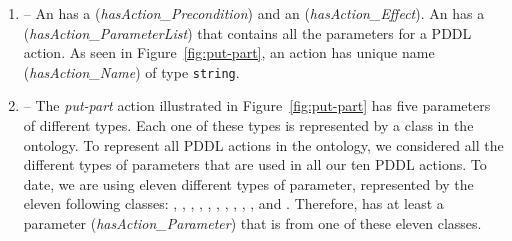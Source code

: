 \begin{enumerate}
\item {} -- An  has a  (\emph{hasAction\_Precondition}) and an  (\emph{hasAction\_Effect}). An  has a  (\emph{hasAction\_ParameterList}) that contains all the parameters for a PDDL action. As seen in Figure~\ref{fig:put-part}, an action has unique name (\emph{hasAction\_Name}) of type \texttt{string}.
\item {} -- The \textsl{put-part} action illustrated in Figure~\ref{fig:put-part} has five parameters of different types. Each one of these types is represented by a class in the  ontology. To represent all PDDL actions in the  ontology, we considered all the different types of parameters that are used in all our ten PDDL actions. To date, we are using eleven different types of parameter, represented by the eleven following classes: , , , , , , , , , , and . Therefore,  has at least a parameter (\emph{hasAction\_Parameter}) that is from one of these eleven classes.


\end{enumerate}
